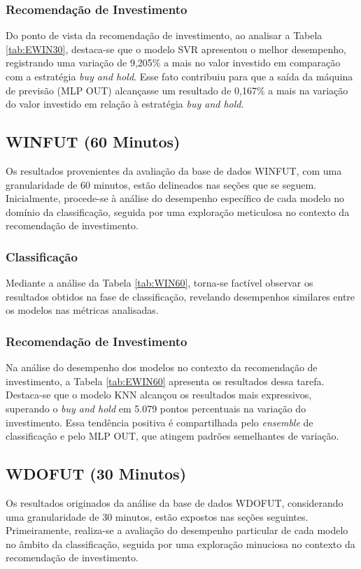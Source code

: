 \subsubsection{Recomendação de Investimento}

Do ponto de vista da recomendação de investimento, ao analisar a Tabela \ref{tab:EWIN30}, destaca-se que o modelo \ac{SVR} apresentou o melhor desempenho, registrando uma variação de 9,205\% a mais no valor investido em comparação com a estratégia \textit{buy and hold}. Esse fato contribuiu para que a saída da máquina de previsão (\ac{MLP} OUT) alcançasse um resultado de 0,167\% a mais na variação do valor investido em relação à estratégia \textit{buy and hold}.

\subsection{WINFUT (60 Minutos)}
Os resultados provenientes da avaliação da base de dados WINFUT, com uma granularidade de 60 minutos, estão delineados nas seções que se seguem. Inicialmente, procede-se à análise do desempenho específico de cada modelo no domínio da classificação, seguida por uma exploração meticulosa no contexto da recomendação de investimento.
\subsubsection{Classificação}
Mediante a análise da Tabela \ref{tab:WIN60}, torna-se factível observar os resultados obtidos na fase de classificação, revelando desempenhos similares entre os modelos nas métricas analisadas.
\subsubsection{Recomendação de Investimento}
Na análise do desempenho dos modelos no contexto da recomendação de investimento, a Tabela \ref{tab:EWIN60} apresenta os resultados dessa tarefa. Destaca-se que o modelo \ac{KNN} alcançou os resultados mais expressivos, superando o \textit{buy and hold} em 5.079 pontos percentuais na variação do investimento. Essa tendência positiva é compartilhada pelo \textit{ensemble} de classificação e pelo \ac{MLP} OUT, que atingem padrões semelhantes de variação.

\subsection{WDOFUT (30 Minutos)}
Os resultados originados da análise da base de dados WDOFUT, considerando uma granularidade de 30 minutos, estão expostos nas seções seguintes. Primeiramente, realiza-se a avaliação do desempenho particular de cada modelo no âmbito da classificação, seguida por uma exploração minuciosa no contexto da recomendação de investimento.

